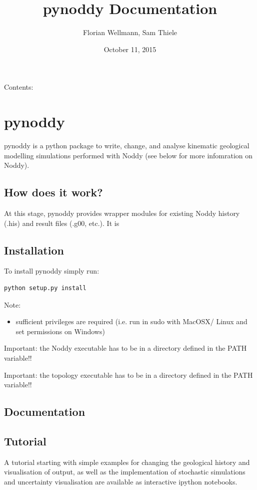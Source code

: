 \documentclass[a4paper,10pt,english]{sphinxmanual}
\title{pynoddy Documentation}
\date{October 11, 2015}
\author{Florian Wellmann, Sam Thiele}
\begin{document}
\maketitle
\tableofcontents
{}\label{index::doc}


Contents:


\chapter{pynoddy}
\label{readme:welcome-to-pynoddy-s-documentation}\label{readme::doc}\label{readme:pynoddy}
pynoddy is a python package to write, change, and analyse kinematic
geological modelling simulations performed with Noddy (see below for
more infomration on Noddy).


\section{How does it work?}
\label{readme:how-does-it-work}
At this stage, pynoddy provides wrapper modules for existing Noddy
history (.his) and result files (.g00, etc.). It is


\section{Installation}
\label{readme:installation}
To install pynoddy simply run:

\begin{Verbatim}[commandchars=\\\{\}]
python setup.py install
\end{Verbatim}

Note:
\begin{itemize}
\item {} 
sufficient privileges are required (i.e. run in sudo with MacOSX/
Linux and set permissions on Windows)

\end{itemize}

Important: the Noddy executable has to be in a directory defined in the
PATH variable!!

Important: the topology executable has to be in a directory defined in
the PATH variable!!


\section{Documentation}
\label{readme:documentation}

\section{Tutorial}
\label{readme:tutorial}
A tutorial starting with simple examples for changing the geological
history and visualisation of output, as well as the implementation of
stochastic simulations and uncertainty visualisation are available as
interactive ipython notebooks.
\end{document}
